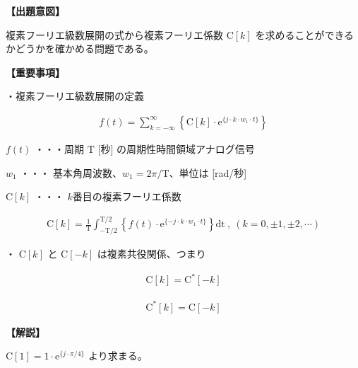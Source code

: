 \noindent \textbf{【出題意図】}

\bigskip
\noindent 複素フーリエ級数展開の式から複素フーリエ係数 $\textrm{C}[k]$ を求めることができるかどうかを確かめる問題である。

\vspace{1em}
\noindent \textbf{【重要事項】}

\medskip
\noindent ・複素フーリエ級数展開の定義

\begin{align*}
f(t) = \sum_{k = -\infty}^{\infty} 
\left \{
\textrm{C}[k] \cdot \textrm{e}^{\{j \cdot k \cdot w_1 \cdot t \}}
\right \}
\end{align*}

\medskip
\noindent $f(t)$ ・・・周期 $\textrm{T}$ [秒] の周期性時間領域アナログ信号

\medskip
\noindent $w_1$ ・・・ 基本角周波数、$w_1 = 2\pi/\textrm{T}$、単位は [rad/秒]

\medskip
\noindent $\textrm{C}[k]$ ・・・ $k$番目の複素フーリエ係数

\begin{align*}
\textrm{C}[k] = \frac{1}{\textrm{T}} \int_{-\textrm{T}/2}^{\textrm{T}/2} 
\left \{
f(t) \cdot \textrm{e}^{\{-j \cdot k \cdot w_1 \cdot t \}} 
\right \}
\textrm{dt}
\ ,\  (k = 0, \pm 1, \pm 2, \cdots)
\end{align*}

\bigskip
\noindent ・ $\textrm{C}[k]$ と $\textrm{C}[-k]$ は複素共役関係、つまり

\begin{align*}
\textrm{C}[k] = \textrm{C}^{*}[-k]
\end{align*}

\begin{align*}
\textrm{C}^{*}[k] = \textrm{C}[-k]
\end{align*}

\bigskip

\vspace{1em}
\noindent \textbf{【解説】}

\bigskip
\noindent $\textrm{C}[1] = 1 \cdot \textrm{e}^{\{ j \cdot \pi/4 \}}$ より求まる。

